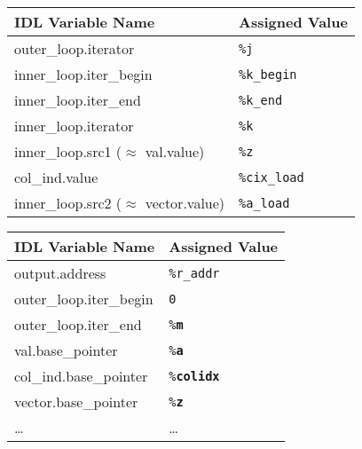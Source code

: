 \vspace{-10.5mm}
{\phantom{\Huge$\Downarrow$}
\hspace{-2.73mm}{\bf~~~Idiom Detection with IDL~~}\hspace{-3.69mm}
\phantom{\Huge$\Downarrow$}
\hspace{-3.69mm}
\phantom{\Huge$\Downarrow$}}
\hspace{5.1mm}
\vspace{4mm}

{\footnotesize\renewcommand{\arraystretch}{0.8}
\begin{tabular}{p{4.1cm}l}
    \toprule
    \textbf{IDL Variable Name} & \textbf{Assigned Value}\\
    \midrule
    outer\_loop.iterator                      & {\tt\%j}\\
    inner\_loop.iter\_begin                   & {\tt\%k\_begin}\\
    inner\_loop.iter\_end                     & {\tt\%k\_end}\\
    inner\_loop.iterator                      & {\tt\%k}\\
    inner\_loop.src1 ($\approx$ val.value)    & {\tt\%z}\\
    col\_ind.value                            & {\tt\%cix\_load}\\
    inner\_loop.src2 ($\approx$ vector.value) & {\tt\%a\_load}\\
    \bottomrule
\end{tabular}
\hfill
{}
\begin{tabular}{p{4.1cm}l}
    \toprule
    \textbf{IDL Variable Name} & \textbf{Assigned Value}\\
    \midrule
    output.address          & {\tt\%r\_addr}\\
    outer\_loop.iter\_begin & {\tt0}\\
    outer\_loop.iter\_end   & {\tt\%\bf m}\\
    val.base\_pointer       & {\tt\%\bf a}\\
    col\_ind.base\_pointer  & {\tt\%\bf colidx}\\
    vector.base\_pointer    & {\tt\%\bf z}\\
    \dots                   & \dots\\
    \bottomrule
\end{tabular}}

